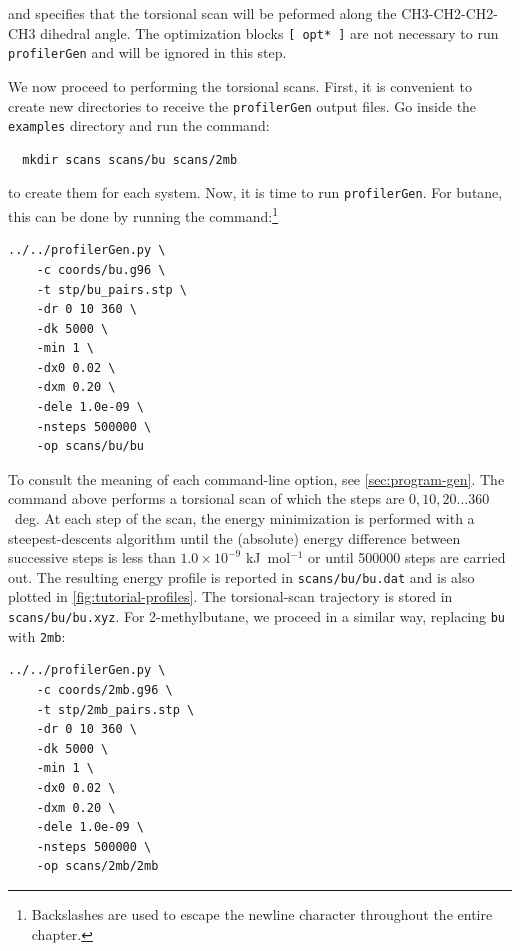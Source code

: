 \documentclass[10pt,a4paper]{report}
\numberwithin{equation}{section}
\newcommand{\profilergen}[0]{\texttt{profilerGen}}
\begin{document}
\noindent 
%
and specifies that the torsional scan will be peformed along the
CH3-CH2-CH2-CH3 dihedral angle.
%
The optimization blocks \texttt{[~opt*~]} are not necessary to run
\profilergen{} and will be ignored in this step.

We now proceed to performing the torsional scans.
%
First, it is convenient to create new directories to receive the
\profilergen{} output files. Go inside the \texttt{examples} directory
and run the command:

\begin{lstlisting}
  mkdir scans scans/bu scans/2mb
\end{lstlisting}
\vspace{-2ex}\par

\noindent to create them for each system.
%
Now, it is time to run \profilergen{}.
%
For butane, this can be done by running the command:\footnote{Backslashes are used to escape the newline character throughout the entire chapter.}

\begin{lstlisting}
../../profilerGen.py \
    -c coords/bu.g96 \
    -t stp/bu_pairs.stp \
    -dr 0 10 360 \
    -dk 5000 \
    -min 1 \
    -dx0 0.02 \
    -dxm 0.20 \
    -dele 1.0e-09 \
    -nsteps 500000 \
    -op scans/bu/bu
\end{lstlisting}\vspace{-2ex}\par

\noindent To consult the meaning of each command-line option, see
\autoref{sec:program-gen}.
%
The command above performs a torsional scan of which the steps are
$0,10,20\ldots360$~deg.
%
At each step of the scan, the energy minimization is performed with a
steepest-descents algorithm until the (absolute) energy difference
between successive steps is less than $1.0\times 10^{-9}$
kJ~mol$^{-1}$ or until 500000 steps are carried out.
%
The resulting energy profile is reported in \texttt{scans/bu/bu.dat}
and is also plotted in \autoref{fig:tutorial-profiles}.
%
The torsional-scan trajectory is stored in \texttt{scans/bu/bu.xyz}.
%
For 2-methylbutane, we proceed in a similar way, replacing \texttt{bu}
with \texttt{2mb}:

\begin{lstlisting}
../../profilerGen.py \
    -c coords/2mb.g96 \
    -t stp/2mb_pairs.stp \
    -dr 0 10 360 \
    -dk 5000 \
    -min 1 \
    -dx0 0.02 \
    -dxm 0.20 \
    -dele 1.0e-09 \
    -nsteps 500000 \
    -op scans/2mb/2mb
\end{lstlisting}\vspace{-2ex}\par
\end{document}
